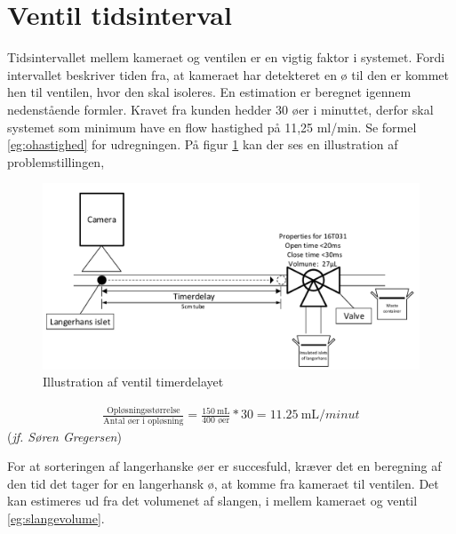 
 \section{Ventil tidsinterval}
Tidsintervallet mellem kameraet og ventilen er en vigtig faktor i systemet. Fordi intervallet beskriver tiden fra, at kameraet har detekteret en ø til den er kommet hen til ventilen, hvor den skal isoleres. En estimation er beregnet igennem nedenstående formler. Kravet fra kunden hedder 30 øer i minuttet, derfor skal systemet som minimum have en flow hastighed på 11,25 ml/min. Se formel \ref{eg:ohastighed} for udregningen. På figur \ref{fig:tidsintervalventil} kan der ses en illustration af problemstillingen,

\begin{figure}[H]
	\centering
	\includegraphics[width=1\textwidth]{billeder/Hovedrapport/tidsinterval.pdf}
	\caption{Illustration af ventil timerdelayet}
	\label{fig:tidsintervalventil}
\end{figure}

\begin{align}
\frac{\text{Opløsningsstørrelse}}{\text{Antal øer i opløsning}} = \frac{\SI{150}{\milli\liter}}{400\text{ øer}}*30 = \SI{11,25}{\milli\liter/minut} 
\label{eg:ohastighed}
\end{align}(\textit{jf. Søren Gregersen})

For at sorteringen af langerhanske øer er succesfuld, kræver det en beregning af den tid det tager for en langerhansk ø, at komme fra kameraet til ventilen. Det kan estimeres ud fra det volumenet af slangen, i mellem kameraet og ventil \ref{eg:slangevolume}.

